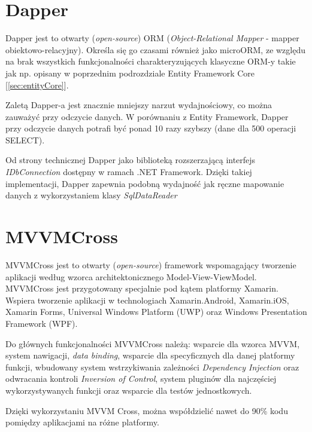 \section{Dapper}
\label{sec:dapper}
Dapper jest to otwarty (\textit{open-source}) ORM (\textit{Object-Relational Mapper} - mapper obiektowo-relacyjny). Określa się go czasami również jako microORM, ze względu na brak wszystkich funkcjonalności charakteryzujących klasyczne ORM-y takie jak np. opisany w poprzednim podrozdziale Entity Framework Core [\ref{sec:entityCore}]. 

Zaletą Dapper-a jest znacznie mniejszy narzut wydajnościowy, co można zauważyć przy odczycie danych. W porównaniu z Entity Framework, Dapper przy odczycie danych potrafi być ponad 10 razy szybszy (dane dla 500 operacji SELECT).

Od strony technicznej Dapper jako biblioteką rozszerzającą interfejs \textit{IDbConnection} dostępny w ramach .NET Framework. Dzięki takiej implementacji, Dapper zapewnia podobną wydajność jak ręczne mapowanie danych z wykorzystaniem klasy \textit{SqlDataReader} \cite{StackExc69:online}  
\section{MVVMCross}
\label{sec:mvvmCross}
MVVMCross jest to otwarty (\textit{open-source}) framework wspomagający tworzenie aplikacji według wzorca architektonicznego Model-View-ViewModel. MVVMCross jest przygotowany specjalnie pod kątem platformy Xamarin. Wspiera tworzenie aplikacji w technologiach Xamarin.Android, Xamarin.iOS, Xamarin Forms, Universal Windows Platform (UWP) oraz Windows Presentation Framework (WPF).

Do głównych funkcjonalności MVVMCross należą: wsparcie dla wzorca MVVM, system nawigacji, \textit{data binding}, wsparcie dla specyficznych dla danej platformy funkcji, wbudowany system wstrzykiwania zależności \textit{Dependency Injection} oraz odwracania kontroli \textit{Inversion of Control}, system pluginów dla najczęściej wykorzystywanych funkcji oraz wsparcie dla testów jednostkowych. \cite{GettingS94:online}

Dzięki wykorzystaniu MVVM Cross, można współdzielić nawet do 90\% kodu pomiędzy aplikacjami na różne platformy.
